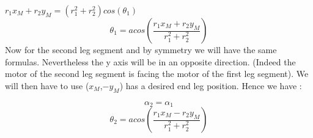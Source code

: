 \documentclass [11pt]{article}
\begin{document}
\linebreak
$r_1x_M + r_2y_M = (r^2_1+r^2_2)cos(\theta_1)$\\
\linebreak
\begin{equation}\label{eqn:res2}
     \boxed{\theta_1 = acos(\frac{r_1x_M+r_2y_M}{r^2_1+r^2_2})}
\end{equation}
Now for the second leg segment and by symmetry we will have the same formulas. Nevertheless the y axis will be in an opposite direction. (Indeed the motor of the second leg segment is facing the motor of the first leg segment). We will then have to use ($x_M$,$-y_M$) has a desired end leg position. Hence we have :

\begin{equation}\label{eqn:res1}
     \boxed{\alpha_2 = \alpha_1}
\end{equation}
\begin{equation}\label{eqn:res1}
     \boxed{\theta_2 = acos(\frac{r_1x_M-r_2y_M}{r^2_1+r^2_2})}
\end{equation}
\end{document}

